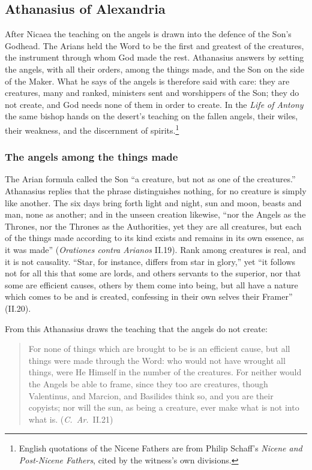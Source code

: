 \sectionguard
\subsection{Athanasius of Alexandria}\label{sec:fb-athanasius}

After Nicaea the teaching on the angels is drawn into the defence of the
Son's Godhead. The Arians held the Word to be the first and greatest of
the creatures, the instrument through whom God made the rest. Athanasius
answers by setting the angels, with all their orders, among the things
made, and the Son on the side of the Maker. What he says of the angels is
therefore said with care: they are creatures, many and ranked, ministers
sent and worshippers of the Son; they do not create, and God needs none
of them in order to create. In the \emph{Life of Antony} the same bishop
hands on the desert's teaching on the fallen angels, their wiles, their
weakness, and the discernment of spirits.\footnote{English quotations of
the Nicene Fathers are from Philip Schaff's \emph{Nicene and Post-Nicene
Fathers}, cited by the witness's own divisions.}

\subsubsection{The angels among the things made}

The Arian formula called the Son ``a creature, but not as one of the
creatures.'' Athanasius replies that the phrase distinguishes nothing,
for no creature is simply like another. The six days bring forth light
and night, sun and moon, beasts and man, none as another; and in the
unseen creation likewise, ``nor the Angels as the Thrones, nor the Thrones
as the Authorities, yet they are all creatures, but each of the things made
according to its kind exists and remains in its own essence, as it was
made'' (\emph{Orationes contra Arianos} II.19). Rank among creatures is
real, and it is not causality. ``Star, for instance, differs from star in
glory,'' yet ``it follows not for all this that some are lords, and
others servants to the superior, nor that some are efficient causes,
others by them come into being, but all have a nature which comes to be
and is created, confessing in their own selves their Framer'' (II.20).

From this Athanasius draws the teaching that the angels do not create:

\begin{quote}
For none of things which are brought to be is an efficient cause, but all
things were made through the Word: who would not have wrought all things,
were He Himself in the number of the creatures. For neither would the
Angels be able to frame, since they too are creatures, though Valentinus,
and Marcion, and Basilides think so, and you are their copyists; nor will
the sun, as being a creature, ever make what is not into what is.
(\emph{C.\ Ar.}\ II.21)
\end{quote}

